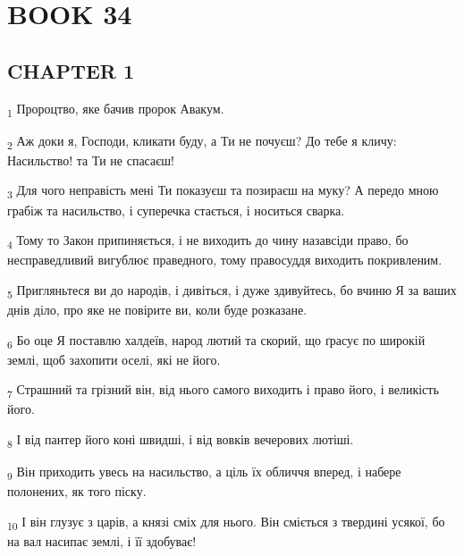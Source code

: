 \section{BOOK 34}
\subsection{CHAPTER 1}
\begin{tcolorbox}
\textsubscript{1} Пророцтво, яке бачив пророк Авакум.
\end{tcolorbox}
\begin{tcolorbox}
\textsubscript{2} Аж доки я, Господи, кликати буду, а Ти не почуєш? До тебе я кличу: Насильство! та Ти не спасаєш!
\end{tcolorbox}
\begin{tcolorbox}
\textsubscript{3} Для чого неправість мені Ти показуєш та позираєш на муку? А передо мною грабіж та насильство, і суперечка стається, і носиться сварка.
\end{tcolorbox}
\begin{tcolorbox}
\textsubscript{4} Тому то Закон припиняється, і не виходить до чину назавсіди право, бо несправедливий вигублює праведного, тому правосуддя виходить покривленим.
\end{tcolorbox}
\begin{tcolorbox}
\textsubscript{5} Пригляньтеся ви до народів, і дивіться, і дуже здивуйтесь, бо вчиню Я за ваших днів діло, про яке не повірите ви, коли буде розказане.
\end{tcolorbox}
\begin{tcolorbox}
\textsubscript{6} Бо оце Я поставлю халдеїв, народ лютий та скорий, що ґрасує по широкій землі, щоб захопити оселі, які не його.
\end{tcolorbox}
\begin{tcolorbox}
\textsubscript{7} Страшний та грізний він, від нього самого виходить і право його, і великість його.
\end{tcolorbox}
\begin{tcolorbox}
\textsubscript{8} І від пантер його коні швидші, і від вовків вечерових лютіші.
\end{tcolorbox}
\begin{tcolorbox}
\textsubscript{9} Він приходить увесь на насильство, а ціль їх обличчя вперед, і набере полонених, як того піску.
\end{tcolorbox}
\begin{tcolorbox}
\textsubscript{10} І він глузує з царів, а князі сміх для нього. Він сміється з твердині усякої, бо на вал насипає землі, і її здобуває!
\end{tcolorbox}
